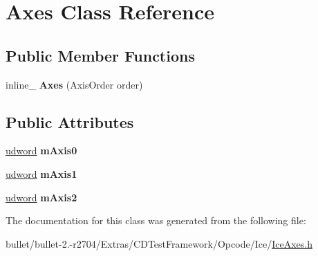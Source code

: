 \hypertarget{class_axes}{\section{Axes Class Reference}
\label{class_axes}
}
\subsection*{Public Member Functions}
\begin{DoxyCompactItemize}
\item 
\hypertarget{class_axes_afc6cb9cc184d368fc3396822721b7396}{inline\+\_\+ {\bfseries Axes} (Axis\+Order order)}\label{class_axes_afc6cb9cc184d368fc3396822721b7396}

\end{DoxyCompactItemize}
\subsection*{Public Attributes}
\begin{DoxyCompactItemize}
\item 
\hypertarget{class_axes_ac5bcbfce6741b8846eb8d21aef50081c}{\hyperlink{_ice_types_8h_a44c6f1920ba5551225fb534f9d1a1733}{udword} {\bfseries m\+Axis0}}\label{class_axes_ac5bcbfce6741b8846eb8d21aef50081c}

\item 
\hypertarget{class_axes_a7ca52fbdbdfeb2e2f0374ebe5e546444}{\hyperlink{_ice_types_8h_a44c6f1920ba5551225fb534f9d1a1733}{udword} {\bfseries m\+Axis1}}\label{class_axes_a7ca52fbdbdfeb2e2f0374ebe5e546444}

\item 
\hypertarget{class_axes_a5b43e8f1a068fdfcdfefe677b24ceff1}{\hyperlink{_ice_types_8h_a44c6f1920ba5551225fb534f9d1a1733}{udword} {\bfseries m\+Axis2}}\label{class_axes_a5b43e8f1a068fdfcdfefe677b24ceff1}

\end{DoxyCompactItemize}


The documentation for this class was generated from the following file\+:\begin{DoxyCompactItemize}
\item 
bullet/bullet-\/2.-\/r2704/\+Extras/\+C\+D\+Test\+Framework/\+Opcode/\+Ice/\hyperlink{_ice_axes_8h}{Ice\+Axes.\+h}\end{DoxyCompactItemize}
